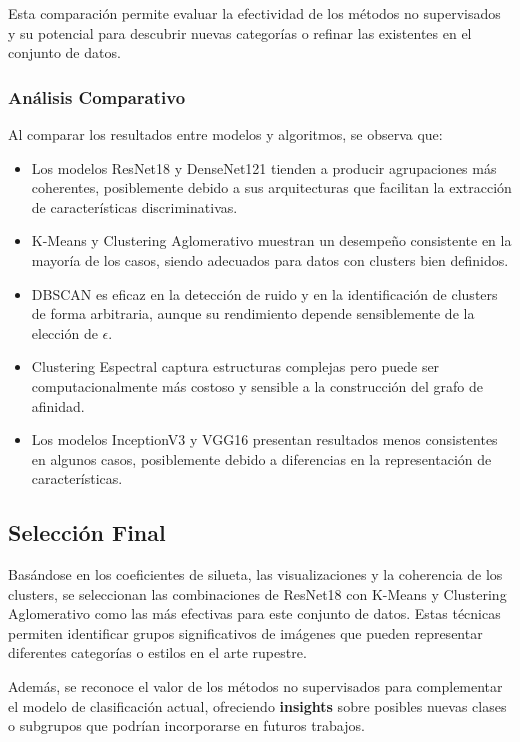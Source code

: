 Esta comparación permite evaluar la efectividad de los métodos no supervisados y su potencial para descubrir nuevas categorías o refinar las existentes en el conjunto de datos.

\subsubsection{Análisis Comparativo}

Al comparar los resultados entre modelos y algoritmos, se observa que:

\begin{itemize} \item Los modelos ResNet18 y DenseNet121 tienden a producir agrupaciones más coherentes, posiblemente debido a sus arquitecturas que facilitan la extracción de características discriminativas. \item K-Means y Clustering Aglomerativo muestran un desempeño consistente en la mayoría de los casos, siendo adecuados para datos con clusters bien definidos. \item DBSCAN es eficaz en la detección de ruido y en la identificación de clusters de forma arbitraria, aunque su rendimiento depende sensiblemente de la elección de $\epsilon$. \item Clustering Espectral captura estructuras complejas pero puede ser computacionalmente más costoso y sensible a la construcción del grafo de afinidad. \item Los modelos InceptionV3 y VGG16 presentan resultados menos consistentes en algunos casos, posiblemente debido a diferencias en la representación de características. \end{itemize}

\subsection{Selección Final}

Basándose en los coeficientes de silueta, las visualizaciones y la coherencia de los clusters, se seleccionan las combinaciones de ResNet18 con K-Means y Clustering Aglomerativo como las más efectivas para este conjunto de datos. Estas técnicas permiten identificar grupos significativos de imágenes que pueden representar diferentes categorías o estilos en el arte rupestre.

Además, se reconoce el valor de los métodos no supervisados para complementar el modelo de clasificación actual, ofreciendo \textbf{insights} sobre posibles nuevas clases o subgrupos que podrían incorporarse en futuros trabajos.

